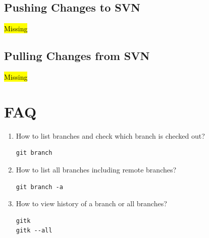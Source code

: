 \documentclass[a4paper,10pt]{article}
\begin{document}
\begin{itemize}
\subsection{Pushing Changes to SVN}
\hl{Missing}


\subsection{Pulling Changes from SVN}
\hl{Missing}




\end{itemize}



\section{FAQ}
\begin{enumerate}
  \item How to list branches and check which branch is checked out?
    \begin{lstlisting}
git branch
    \end{lstlisting}
  \item How to list all branches including remote branches?
    \begin{lstlisting}
git branch -a
    \end{lstlisting}
  \item How to view history of a branch or all branches?
    \begin{lstlisting}
gitk
gitk --all
    \end{lstlisting}

\end{enumerate}
\end{document}
